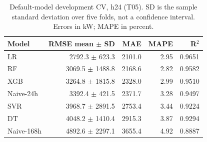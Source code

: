 \begin{table}[H]\centering\small
\caption{Default-model development CV, h24 (T05). SD is the sample standard deviation over five folds, not a confidence interval. Errors in kW; MAPE in percent.}\label{tab:cv}
\setlength{\tabcolsep}{4pt}
\begin{tabular}{lrrrr}
\toprule
Model & RMSE mean $\pm$ SD & MAE & MAPE & R$^2$ \\
\midrule
LR & \num{2792.3} $\pm$ \num{623.3} & \num{2101.0} & \num{2.95} & \num{0.9651} \\
RF & \num{3069.5} $\pm$ \num{1488.8} & \num{2168.6} & \num{2.82} & \num{0.9582} \\
XGB & \num{3264.8} $\pm$ \num{1815.8} & \num{2328.0} & \num{2.99} & \num{0.9510} \\
Naive-24h & \num{3392.4} $\pm$ \num{421.5} & \num{2371.7} & \num{3.28} & \num{0.9497} \\
SVR & \num{3968.7} $\pm$ \num{2891.5} & \num{2753.4} & \num{3.44} & \num{0.9224} \\
DT & \num{4048.2} $\pm$ \num{1410.4} & \num{2915.3} & \num{3.87} & \num{0.9294} \\
Naive-168h & \num{4892.6} $\pm$ \num{2297.1} & \num{3655.4} & \num{4.92} & \num{0.8887} \\
\bottomrule\end{tabular}
\end{table}
